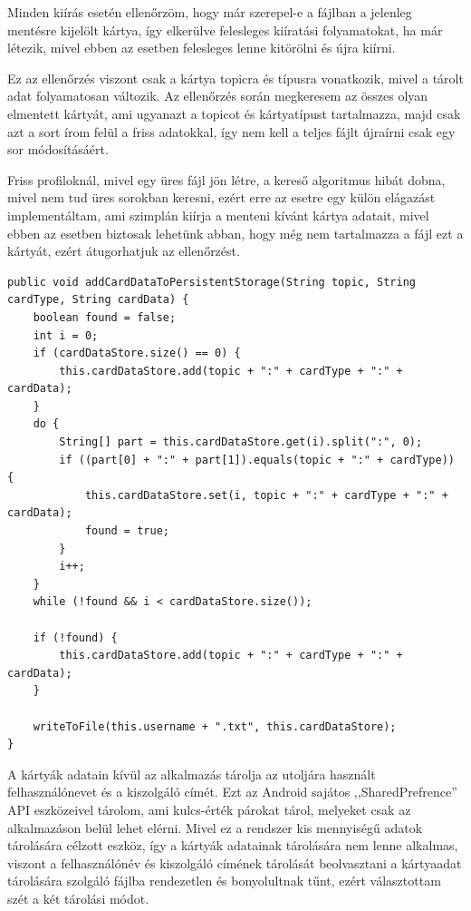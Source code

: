 \documentclass[
]{thesis-ekf}
\theoremstyle{definition}
\theoremstyle{remark}
\begin{document}
Minden kiírás esetén ellenőrzöm, hogy már szerepel-e a fájlban a jelenleg mentésre kijelölt kártya, így elkerülve
felesleges kiíratási folyamatokat, ha már létezik, mivel ebben az esetben felesleges lenne kitörölni és újra kiírni.

Ez az ellenőrzés viszont csak a kártya topicra és típusra vonatkozik, mivel a tárolt adat folyamatosan változik.
Az ellenőrzés során megkeresem az összes olyan elmentett kártyát, ami ugyanazt a topicot és kártyatípust tartalmazza,
majd csak azt a sort írom felül a friss adatokkal, így nem kell a teljes fájlt újraírni csak egy sor módosításáért.

Friss profiloknál, mivel egy üres fájl jön létre, a kereső algoritmus hibát dobna, mivel nem tud üres sorokban
keresni, ezért erre az esetre egy külön elágazást implementáltam, ami szimplán kiírja a menteni kívánt kártya adatait,
mivel ebben az esetben biztosak lehetünk abban, hogy még nem tartalmazza a fájl ezt a kártyát, ezért átugorhatjuk az
ellenőrzést.


\lstset{language=Java}  
\begin{lstlisting}[frame=single]
public void addCardDataToPersistentStorage(String topic, String cardType, String cardData) {
	boolean found = false;
	int i = 0;
	if (cardDataStore.size() == 0) {
		this.cardDataStore.add(topic + ":" + cardType + ":" + cardData);
	}
	do {
		String[] part = this.cardDataStore.get(i).split(":", 0);
		if ((part[0] + ":" + part[1]).equals(topic + ":" + cardType)) {
			this.cardDataStore.set(i, topic + ":" + cardType + ":" + cardData);
			found = true;
		}
		i++;
	}
	while (!found && i < cardDataStore.size());

	if (!found) {
		this.cardDataStore.add(topic + ":" + cardType + ":" + cardData);
	}

	writeToFile(this.username + ".txt", this.cardDataStore);
}
\end{lstlisting}

A kártyák adatain kívül az alkalmazás tárolja az utoljára használt felhasználónevet és a kiszolgáló címét.
Ezt az Android sajátos ,,SharedPrefrence'' API eszközeivel tárolom, ami kulcs-érték párokat tárol, melyeket csak az
alkalmazáson belül lehet elérni.
Mivel ez a rendszer kis mennyiségű adatok tárolására célzott eszköz, így a kártyák adatainak tárolására nem lenne
alkalmas, viszont a felhasználónév és kiszolgáló címének tárolását beolvasztani a kártyaadat tárolására szolgáló
fájlba rendezetlen és bonyolultnak tűnt, ezért választottam szét a két tárolási módot.
\end{document}
